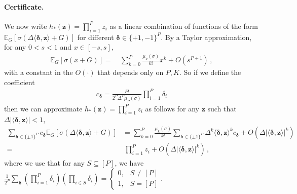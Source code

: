\documentclass[11pt]{article}
\newcommand{\E}{\mathbb{E}}
\newcommand{\<}{\langle}
\renewcommand{\>}{\rangle}
\theoremstyle{definition}
\def\bz{{\boldsymbol z}}
\def\bdelta{{\boldsymbol\delta}}
\def\bz{{\boldsymbol z}}
\def\bdelta{{\boldsymbol\delta}}
\def\bz{{\boldsymbol z}}
\begin{document}
\paragraph*{Certificate.} 
We now write $h_*(\bz) = \prod_{i=1}^P z_i$ as a linear combination of functions of the form $\E_G[\sigma(\Delta\<\bdelta,\bz\>+G)]$ for different $\bdelta \in \{+1,-1\}^P$. By a Taylor approximation, for any $0 < s < 1$ and $x \in [-s, s]$,
\begin{align*}
\E_G [ \sigma (x + G) ] =&~  \sum_{k = 0}^P \frac{\mu_k(\sigma) }{k!} x^k + O(s^{P+1})\,,
\end{align*}
with a constant in the $O(\cdot)$ that depends only on $P,K$.
So if we define the coefficient 
\begin{align*}
c_{\bdelta} = \frac{P!}{2^P \Delta^P \mu_P(\sigma)} \prod_{i=1}^P \delta_i
\end{align*}
then we can approximate $h_*(\bz) = \prod_{i=1}^P z_i$ as follows for any $\bz$ such that $\Delta|\<\bdelta,\bz\>| < 1$,
\begin{align*}
\sum_{\bdelta \in \{\pm 1\}^P} c_{\bdelta} \E_G [ \sigma (\Delta\<\bdelta,\bz\> + G) ] &= \sum_{k = 0}^P \frac{\mu_k(\sigma)}{k!} \sum_{\bdelta \in \{\pm 1\}^P} \Delta^k\<\bdelta,\bz\>^k c_{\bdelta} + O(\Delta|\<\bdelta,\bz\>|^k) \\
=&~ \prod_{i=1}^P z_i + O(\Delta|\<\bdelta,\bz\>|^k)\,,
\end{align*}
where we use that for any $S \subseteq [P]$, we have $\frac{1}{2^P} \sum_{\bdelta} (\prod_{i=1}^P \delta_i)(\prod_{i \in S} \delta_i) = \begin{cases} 0, & S \neq [P] \\ 1, & S = [P] \end{cases}$.
\end{document}
